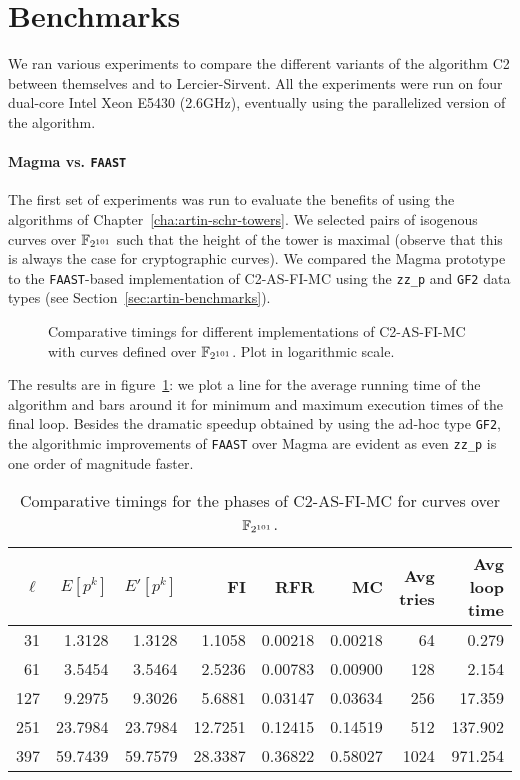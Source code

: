 \section{Benchmarks}
\label{sec:benchmarks}
We ran various experiments to compare the different variants of the
algorithm C2 between themselves and to Lercier-Sirvent. All the
experiments were run on four dual-core Intel Xeon E5430 (2.6GHz),
eventually using the parallelized version of the algorithm.

\paragraph{Magma vs. \texttt{FAAST}}
\label{sec:magma-vs.-textttf}
The first set of experiments was run to evaluate the benefits of using
the algorithms of Chapter~\ref{cha:artin-schr-towers}. We selected
pairs of isogenous curves over $\mathbb{F}_{2^{101}}$ such that the height of
the tower is maximal (observe that this is always the case for
cryptographic curves).  We compared the Magma prototype to the
\texttt{FAAST}-based implementation of C2-AS-FI-MC using the
\texttt{zz\_p} and \texttt{GF2} data types (see
Section~\ref{sec:artin-benchmarks}).

\begin{figure}
  \centering
  \caption{Comparative timings for different implementations of C2-AS-FI-MC with curves defined over $\mathbb{F}_{2^{101}}$. Plot in logarithmic scale.}
  \label{fig:2-101}
\end{figure}

The results are in figure~\ref{fig:2-101}: we plot a line for the
average running time of the algorithm and bars around it for minimum
and maximum execution times of the final loop. Besides the dramatic
speedup obtained by using the ad-hoc type \texttt{GF2}, the
algorithmic improvements of \texttt{FAAST} over Magma are evident as
even \texttt{zz\_p} is one order of magnitude faster.

\begin{table}
  \centering
  \begin{tabular}{r r r r r r r r}
    \hline
    $\ell$ & $E[p^k]$ & $E'[p^k]$ & FI & RFR & MC & Avg tries & Avg loop time\\
    \hline
    31 & 1.3128 & 1.3128 & 1.1058 & 0.00218 & 0.00218 & 64 & 0.279\\
    61 & 3.5454 & 3.5464 & 2.5236 & 0.00783 & 0.00900 & 128 & 2.154 \\
    127 & 9.2975 & 9.3026 & 5.6881 & 0.03147 & 0.03634 & 256 & 17.359 \\
    251	& 23.7984 & 23.7984 & 12.7251 & 0.12415 & 0.14519 & 512 & 137.902 \\
    397 & 59.7439 & 59.7579 & 28.3387 & 0.36822 & 0.58027 & 1024 & 971.254 \\
    \hline
  \end{tabular}
  \caption{Comparative timings for the phases of C2-AS-FI-MC for curves over $\mathbb{F}_{2^{101}}$.}
  \label{tab:C2}
\end{table}

